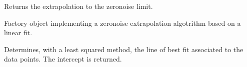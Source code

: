 \documentclass[letterpaper,10pt,english]{sphinxmanual}
\begin{document}
\begin{fulllineitems}
\begin{fulllineitems}
\end{fulllineitems}


\begin{fulllineitems}
\label{\detokenize{apidoc:mitiq.factories.Factory.reduce}}
Returns the extrapolation to the zero\sphinxhyphen{}noise limit.

\end{fulllineitems}


\end{fulllineitems}


\begin{fulllineitems}
\label{\detokenize{apidoc:mitiq.factories.LinearFactory}}
Factory object implementing a zero\sphinxhyphen{}noise extrapolation algotrithm based on a linear fit.

\begin{fulllineitems}
\label{\detokenize{apidoc:mitiq.factories.LinearFactory.reduce}}
Determines, with a least squared method, the line of best fit
associated to the data points. The intercept is returned.

\end{fulllineitems}


\end{fulllineitems}

\end{document}
